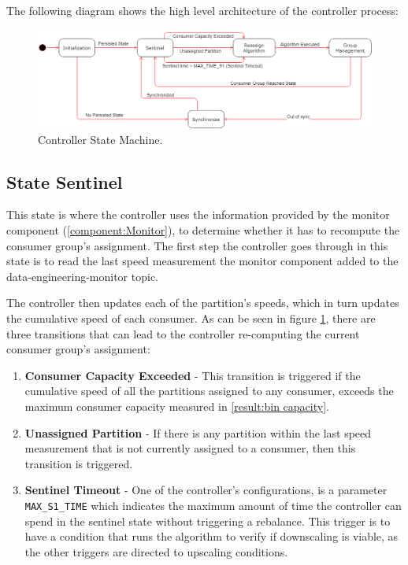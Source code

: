 The following diagram shows the high level architecture of the controller
process:

\begin{figure}[H] \centering
\includegraphics[width=\textwidth]{images/controller/state_machine.png}
\caption{Controller State Machine.} \label{fig:state_machine} \end{figure}

\subsection{State Sentinel}

This state is where the controller uses the information provided by the monitor
component (\ref{component:Monitor}), to determine whether it has to recompute
the consumer group's assignment. The first step the controller goes through in
this state is to read the last speed measurement the monitor component added to
the data-engineering-monitor topic.

The controller then updates each of the partition's speeds, which in turn
updates the cumulative speed of each consumer. As can be seen in figure
\ref{fig:state_machine}, there are three transitions that can lead to the
controller re-computing the current consumer group's assignment:
\begin{enumerate} \item \textbf{Consumer Capacity Exceeded} - This transition is
        triggered if the cumulative speed of all the partitions assigned to any
    consumer, exceeds the maximum consumer capacity measured in \ref{result:bin
capacity}.  \item \textbf{Unassigned Partition} - If there is any partition
    within the last speed measurement that is not currently assigned to a
        consumer, then this transition is triggered.  \item \textbf{Sentinel
            Timeout} - One of the controller's configurations, is a parameter
            \lstinline[language=Python]{MAX_S1_TIME} which indicates the maximum
            amount of time the controller can spend in the sentinel state
            without triggering a rebalance. This trigger is to have a condition
            that runs the algorithm to verify if downscaling is viable, as the
            other triggers are directed to upscaling conditions.
\end{enumerate}

